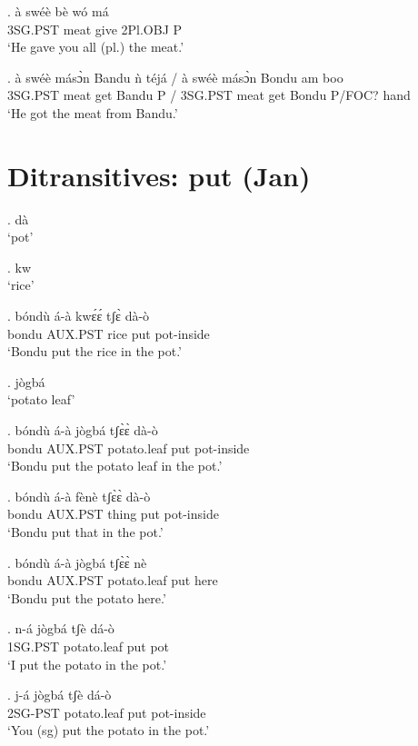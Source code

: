 \documentclass{assets/fieldnotes}
\begin{document}
\exg. à swéè bè wó má\\
3SG.PST meat give 2Pl.OBJ P\\
`He gave you all (pl.) the meat.'


\exg. à swéè másɔ̀n Bandu ǹ téjá / à swéè másɔ̀n Bondu am boo\\
3SG.PST meat get Bandu P {} / 3SG.PST meat get Bondu P/FOC? hand\\
`He got the meat from Bandu.'




\section{Ditransitives: put (Jan)} %


\ex. dà \\
`pot'

\ex. kw \\
`rice'

\exg. bóndù á-à kwɛ́ɛ́ tʃɛ̀ dà-ò \\
bondu AUX.PST rice put pot-inside \\
`Bondu put the rice in the pot.'

\ex. jògbá \\
`potato leaf'

\exg. bóndù á-à jògbá tʃɛ̀ɛ̀ dà-ò \\
bondu AUX.PST potato.leaf put pot-inside \\
`Bondu put the potato leaf in the pot.'

\exg. bóndù á-à fènè tʃɛ̀ɛ̀ dà-ò \\
bondu AUX.PST thing put pot-inside \\
`Bondu put that in the pot.'

\exg. bóndù á-à jògbá tʃɛ̀ɛ̀ nè \\
bondu AUX.PST potato.leaf put here \\
`Bondu put the potato here.'

\exg. n-á jògbá tʃè dá-ò \\
1SG.PST potato.leaf put pot \\
`I put the potato in the pot.'

\exg. j-á jògbá tʃè dá-ò \\
2SG-PST potato.leaf put pot-inside \\
`You (sg) put the potato in the pot.'
\end{document}
